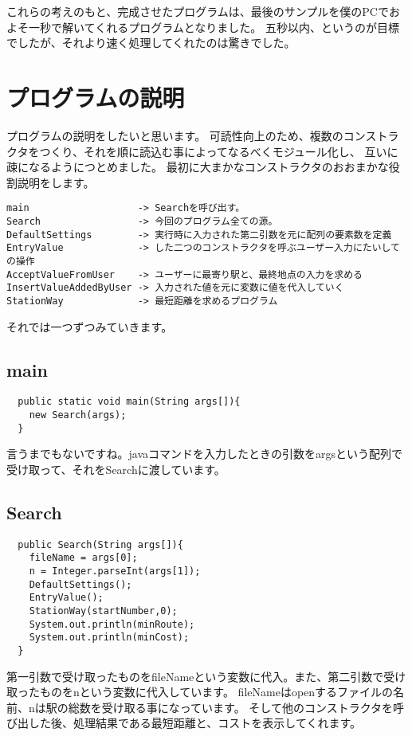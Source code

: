\documentclass[titlepage]{jarticle}
\begin{document}
これらの考えのもと、完成させたプログラムは、最後のサンプルを僕のPCでおよそ一秒で解いてくれるプログラムとなりました。
五秒以内、というのが目標でしたが、それより速く処理してくれたのは驚きでした。


\section{プログラムの説明}
プログラムの説明をしたいと思います。
可読性向上のため、複数のコンストラクタをつくり、それを順に読込む事によってなるべくモジュール化し、
互いに疎になるようにつとめました。
最初に大まかなコンストラクタのおおまかな役割説明をします。

\begin{verbatim}
main                   -> Searchを呼び出す。
Search                 -> 今回のプログラム全ての源。
DefaultSettings        -> 実行時に入力された第二引数を元に配列の要素数を定義
EntryValue             -> した二つのコンストラクタを呼ぶユーザー入力にたいしての操作
AcceptValueFromUser    -> ユーザーに最寄り駅と、最終地点の入力を求める
InsertValueAddedByUser -> 入力された値を元に変数に値を代入していく
StationWay             -> 最短距離を求めるプログラム
\end{verbatim}

それでは一つずつみていきます。

\subsection{main}

\begin{verbatim}
  public static void main(String args[]){
    new Search(args);
  }
\end{verbatim}

言うまでもないですね。javaコマンドを入力したときの引数をargsという配列で受け取って、それをSearchに渡しています。

\subsection{Search}
\begin{verbatim}
  public Search(String args[]){
    fileName = args[0];
    n = Integer.parseInt(args[1]);
    DefaultSettings();
    EntryValue();
    StationWay(startNumber,0);
    System.out.println(minRoute);
    System.out.println(minCost);
  }
\end{verbatim}

第一引数で受け取ったものをfileNameという変数に代入。また、第二引数で受け取ったものをnという変数に代入しています。
fileNameはopenするファイルの名前、nは駅の総数を受け取る事になっています。
そして他のコンストラクタを呼び出した後、処理結果である最短距離と、コストを表示してくれます。
\end{document}
